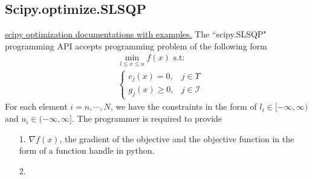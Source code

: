 \documentclass[11pt]{article}
\theoremstyle{definition}
\numberwithin{equation}{subsection}
\begin{document}
    \subsection{Scipy.optimize.SLSQP}
        \href{https://docs.scipy.org/doc/scipy/tutorial/optimize.html}{scipy optimization documentations with examples.}
        The ``scipy.SLSQP" programming API accepts programming problem of the following form 
        \begin{align*}
            & \min_{l \le x\le u} 
            f(x)
            \text{ s.t: }
            \\
            & 
            \begin{cases}
                c_j(x) = 0, & j \in \Upsilon
                \\
                g_j(x) \ge 0, & j \in \mathcal I    
            \end{cases}
        \end{align*}
        For each element $i=n,\cdots, N$, we have the constraints in the form of $l_i \in [-\infty, \infty)$ and $u_i \in (-\infty, \infty]$. 
        The programmer is required to provide 
        \begin{itemize}
            \item[1.] $\nabla f(x)$, the gradient of the objective and the objective function in the form of a function handle in python. 
            \item[2.] 
        \end{itemize}
        
\end{document}
